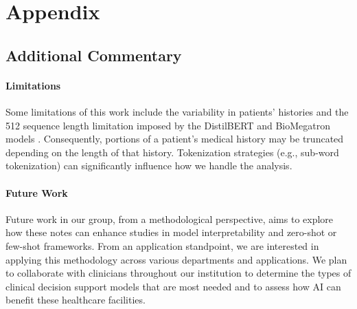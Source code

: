 \documentclass{article}
\theoremstyle{plain}
\theoremstyle{definition}
\theoremstyle{remark}
\begin{document}



\nocite{langley00}





\newpage
\appendix
\onecolumn
\section{Appendix}

\subsection{Additional Commentary}

\paragraph{Limitations} Some limitations of this work include the variability in patients' histories and the 512 sequence length limitation imposed by the DistilBERT \cite{sanh2019distilbert} and BioMegatron models \cite{shin2020biomegatron}. Consequently, portions of a patient's medical history may be truncated depending on the length of that history. Tokenization strategies (e.g., sub-word tokenization) can significantly influence how we handle the analysis.

\paragraph{Future Work} Future work in our group, from a methodological perspective, aims to explore how these notes can enhance studies in model interpretability and zero-shot or few-shot frameworks. From an application standpoint, we are interested in applying this methodology across various departments and applications. We plan to collaborate with clinicians throughout our institution to determine the types of clinical decision support models that are most needed and to assess how AI can benefit these healthcare facilities. 
\end{document}
